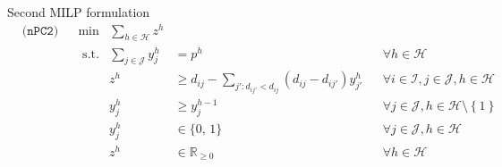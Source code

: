 \documentclass[utf8,aspectratio=169,ngerman,english]{beamer}
\newcommand{\nPCY}{\hyperref[eq:nPCY]{\texttt{(nPC2)}}}
\begin{document}
\begin{frame}{Second MILP formulation}
    \vspace{-15pt}
    \begin{subequations}\label{eq:nPCY} 
        \begin{align}
            &\nPCY  &&\min          &\sum_{h \in \mathcal H}    z^{h}                                                                                                                                                       \label{eq:pc2N-obj}     \\
            &       &&\text{ s.t.}  &\sum_{j \in \mathcal J}    y_{j}^h & =     p^h                                                          && \forall h \in \mathcal H                                                 \label{eq:pc2N-numfac}  \\
            &       &&              &                           z^{h}   & \geq  d_{ij} - \sum_{j':d_{ij'} < d_{ij}} (d_{ij} - d_{ij'})y_{j'}^h  && \forall i \in \mathcal I, j \in \mathcal J, h \in \mathcal H             \label{eq:pc2N-zpush}   \\
            &       &&              &                           y_j^{h} & \geq  y_j^{h-1}                                                       && \forall j \in \mathcal J, h \in \mathcal H \setminus \left \{1 \right \} \label{eq:pc2N-nested}  \\
            &       &&              &                           y_{j}^h & \in   \{\text{0, 1}\}                                                 && \forall j \in \mathcal J, h \in \mathcal H                               \label{eq:pc2N-bin}     \\
            &       &&              &                           z^{h}   & \in   \mathbb R_{\ge 0}                                               && \forall h \in \mathcal H                                                 \label{eq:pc2N-real}
        \end{align} 
    \end{subequations}
\end{frame}
\end{document}
